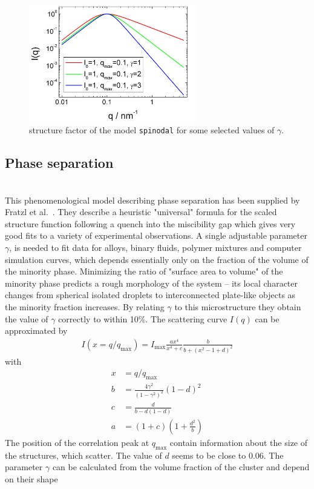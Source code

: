 \begin{figure}[htb]
\begin{center}
\end{center}
\includegraphics[width=0.65\textwidth]{spinodalIQ.png}
\caption{structure factor of the model \texttt{spinodal} for some selected values of $\gamma$.} \label{fig:phaseseparationIQ}
\end{figure}

\clearpage
\subsection{Phase separation}
\label{sect:phase separation}
~\\

This phenomenological model describing phase separation has been supplied by Fratzl et al.\ \cite{Fratzl1989}.
They describe a heuristic "universal" formula for the scaled structure function following
a quench into the miscibility gap which gives very good fits to a variety of experimental observations. A
single adjustable parameter $\gamma$, is needed to fit data for alloys, binary fluids, polymer mixtures and computer
simulation curves, which depends essentially only on the fraction of the volume of the minority phase. Minimizing
the ratio of "surface area to volume" of the minority phase predicts a rough morphology of the system -- its
local character changes from spherical isolated droplets to interconnected plate-like objects as the minority
fraction increases. By relating $\gamma$ to this microstructure they obtain the value of $\gamma$ correctly to within 10\%.
 The scattering curve $I(q)$ can be approximated by
\begin{align}
\label{eq:spinodal2}
I(x=q/q_\mathrm{max}) = I_\text{max} \frac{ax^4}{x^4+c} \frac{b}{b+\left(x^2-1+d\right)^2}
\end{align}
with
\begin{align}
  x &= q/q_\text{max} \\
  b &= \frac{4\gamma^2}{\left(1-\gamma^2\right)^2} \left(1-d\right)^2 \\
  c &= \frac{d}{b-d(1-d)} \\
  a &= (1+c) \left(1+\frac{d^2}{b}\right)
\end{align}
The position of the correlation peak at $q_\text{max}$ contain
information about the size of the structures, which scatter. The value of $d$ seems to
be close to 0.06.
The parameter $\gamma$ can be calculated from the volume fraction of the cluster and depend on their shape

